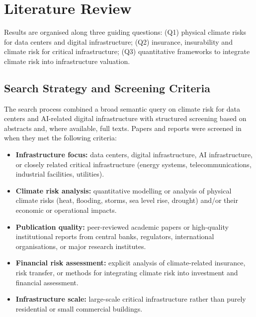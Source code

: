 
\section{Literature Review}
\label{app:literature}

Results are organised along three guiding questions:
(Q1) physical climate risks for data centers and digital infrastructure;
(Q2) insurance, insurability and climate risk for critical infrastructure;
(Q3) quantitative frameworks to integrate climate risk into infrastructure
valuation.

\subsection{Search Strategy and Screening Criteria}

The search process combined a broad semantic query on climate risk for data
centers and AI-related digital infrastructure with structured screening based
on abstracts and, where available, full texts. Papers and reports were
screened in when they met the following criteria:

\begin{itemize}
  \item \textbf{Infrastructure focus:} data centers, digital infrastructure,
        AI infrastructure, or closely related critical infrastructure
        (energy systems, telecommunications, industrial facilities, utilities).
  \item \textbf{Climate risk analysis:} quantitative modelling or analysis of
        physical climate risks (heat, flooding, storms, sea level rise, drought)
        and/or their economic or operational impacts.
  \item \textbf{Publication quality:} peer-reviewed academic papers or
        high-quality institutional reports from central banks, regulators,
        international organisations, or major research institutes.
  \item \textbf{Financial risk assessment:} explicit analysis of
        climate-related insurance, risk transfer, or methods for integrating
        climate risk into investment and financial assessment.
  \item \textbf{Infrastructure scale:} large-scale critical infrastructure
        rather than purely residential or small commercial buildings.
\end{itemize}

